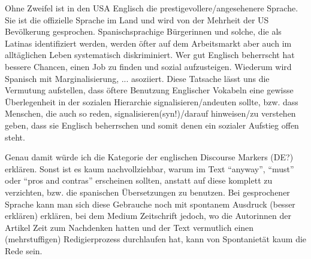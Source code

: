 Ohne Zweifel ist in den USA Englisch die prestigevollere/angesehenere Sprache.
Sie ist die offizielle Sprache im Land und wird von der Mehrheit der US Bevölkerung gesprochen.
Spanischsprachige Bürgerinnen und solche, die als Latinas identifiziert werden, werden öfter auf dem Arbeitsmarkt aber auch im alltäglichen Leben systematisch diskriminiert.
Wer gut Englisch beherrscht hat bessere Chancen, einen Job zu finden und sozial aufzusteigen.
Wiederum wird Spanisch mit Marginalisierung, ... asoziiert. %
Diese Tatsache lässt uns die Vermutung aufstellen, dass öftere Benutzung Englischer Vokabeln eine gewisse Überlegenheit in der sozialen Hierarchie signalisieren/andeuten sollte, bzw. dass Menschen, die auch so reden, signalisieren(syn!)/darauf hinweisen/zu verstehen geben, dass sie Englisch beherrschen und somit denen ein sozialer Aufstieg offen steht.
\begin{comment}
[Zentella07]

distinct ways of being Latina/o are shaped by the dominant language ideology
that equates working-class Spanish speakers with poverty and academic failure,
--> also eine Erklärung, warum sie zu %

In
the USA, where race has been remapped from biology onto language because
public racist remarks are censored, comments about the inferiority and/or
unintelligibility of regional, class, and racial dialects of Spanish and English
substitute for abusive remarks about color, hair, lips, noses, and body parts, with
the same effect.

--> noch eine Erklärung für %

no one expects you to be able to change your color, but you are expected to
change the way you speak radically to earn respect (Urciuoli 1996).

These attitudes are communicated in everyday conversations and promoted by
the media and public institutions, but some groups of Latinas/os are more affected
than others.
\end{comment}

Genau damit würde ich die Kategorie der englischen Discourse Markers (DE?) erklären.
Sonst ist es kaum nachvollziehbar, warum im Text ``anyway'', ``must'' oder ``pros and contras'' erscheinen sollten, anstatt auf diese komplett zu verzichten, bzw. die spanischen Übersetzungen zu benutzen. %
Bei gesprochener Sprache kann man sich diese Gebrauche noch mit spontanem Ausdruck (besser erklären) erklären, bei dem Medium Zeitschrift jedoch, wo die Autorinnen der Artikel Zeit zum Nachdenken hatten und der Text vermutlich einen (mehrstuffigen) Redigierprozess durchlaufen hat, kann von Spontanietät kaum die Rede sein.

